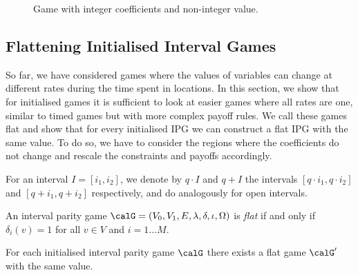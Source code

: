 \documentclass[fleqn,envcountsame]{LMCS}
\newcommand{\labels}{\ensuremath{\lambda}}
\newcommand{\coeff}{\ensuremath{\delta}} \newcommand{\indexi}{\ensuremath{\iota}}
\begin{document}
\begin{figure}[h]
\begin{center}
\end{center}
\caption{Game with integer coefficients and non-integer value.}
\label{fig-game-half-example}
\end{figure}

\subsection{Flattening Initialised Interval Games} \label{subsec_flat}
So far, we have considered games where the values of variables can change at
different rates during the time spent in locations. In this section,
we show that for initialised games it is sufficient to look at easier
games where all rates are one, similar to timed games but with more
complex payoff rules. We call these games flat and show that for every 
initialised IPG we can construct a flat IPG with the same value.
To do so, we have to consider the regions where the coefficients do not
change and rescale the constraints and payoffs accordingly.

For an interval $I = [i_1, i_2]$, we denote by $q \cdot I$
and $q + I$ the intervals $[q \cdot i_1, q \cdot i_2]$ and $[q+i_1, q+i_2]$
respectively, and do analogously for open intervals. 

\begin{defi}
An interval parity game 
$\calG = (V_0, V_1, E, \labels, \coeff,\indexi, \Omega)$
is \emph{flat} if and only if $\coeff_i(v)=1$
for all $v \in V$ and $i=1 \ldots M$.
\end{defi}

\begin{lem} \label{flat}
For each initialised interval parity game $\calG$ there exists
a flat game $\calG'$ with the same value.
\end{lem}
\end{document}
